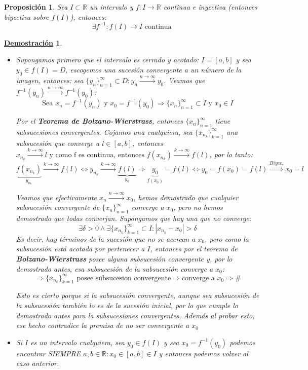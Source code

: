 \documentclass[10pt,a4paper,openright]{book}
\theoremstyle{break}
\newtheorem{prop}{Proposición}[chapter]
\newtheorem*{demo}{\underline{Demostración}}
\begin{document}
\begin{prop}
Sea $I\subset \mathbb R$ un intervalo y $f: I\longrightarrow \mathbb R$ continua e inyectiva (entonces biyectiva sobre $f(I)$), entonces:
$$\exists f^{-1}: f(I)\longrightarrow I\mbox{ continua}$$
\end{prop}
\begin{demo}
\begin{itemize}
\item Supongamos primero que el intervalo es cerrado y acotado: $I=[a,b]$ y sea $y_0\in f(I)=D$, escogemos una sucesión convergente a un número de la imagen, entonces: sea $\{y_n\}_{n=1}^\infty \subset D: y_n\xrightarrow{n\rightarrow \infty} y_0$. Veamos que $f^{-1}(y_n)\xrightarrow{n\rightarrow\infty} f^{-1}(y_0)$:
$$\mbox{Sea }x_n=f^{-1}(y_n)\mbox{ y }x_0=f^{-1}(y_0)\Rightarrow \{x_n\}_{n=1}^\infty\subset I\mbox{ y }x_0\in I$$

Por el \textbf{Teorema de Bolzano-Wierstrass}, entonces $\{x_n\}_{n=1}^\infty$ tiene subsucesiones convergentes. Cojamos una cualquiera, sea $\{x_{n_k}\}_{k=1}^\infty$ una subsucesión que converge a $l\in [a,b]$, entonces $x_{n_k}\xrightarrow{k\rightarrow \infty }l\mbox{ y como f es continua, entonces } f(x_{n_k})\xrightarrow{k\rightarrow \infty}f(l)$, por lo tanto:
$$\underbrace{f(x_{n_k})}_{y_{n_k}}\xrightarrow{k\rightarrow \infty}f(l)\Leftrightarrow y_{n_k}\xrightarrow{k\rightarrow \infty}\underbrace{f(l)}_{y_0}\Rightarrow \underbrace{y_0}_{f(x_0)}=f(l)\Leftrightarrow y_0=f(x_0)=f(l)\stackrel{Biyec.}{\Rightarrow}x_0=l$$

Veamos que efectivamente $x_n\xrightarrow{n\rightarrow\infty}x_0$, hemos demostrado que cualquier subsucesión convergente de $\{x_n\}_{n=1}^\infty$ converge a $x_0$, pero no hemos demostrado que todas converjan. Supongamos que hay una que no converge:
$$\exists \delta>0 \wedge \exists \{x_{n_k}\}_{k=1}^\infty\subset I: |x_{n_k}-x_0|>\delta$$
Es decir, hay términos de la sucesión que no se acercan a $x_0$, pero como la subsucesión está acotada por pertenecer a $I$, entonces por el teorema de \textbf{Bolzano-Wierstrass} posee alguna subsucesión convergente y, por lo demostrado antes, esa subsucesión de la subsucesión converge a $x_0$:
$$\Rightarrow \{x_{n_k}\}_{k=1}^\infty\mbox{ posee subsucesion convergente}\Rightarrow \mbox{converge a }x_0\Rightarrow \#$$

Esto es cierto porque si la subsucesión convergente, aunque sea subsucesión de la subsucesión también lo es de la sucesión inicial, por lo que cumple lo demostrado antes para la subsucesiones convergentes. Además al probar esto, ese hecho contradice la premisa de no ser convergente a $x_0$

\item Si $I$ es un intervalo cualquiera, sea $y_0\in f(I)$ y sea $x_0=f^{-1}(y_0)$ podemos encontrar SIEMPRE $a,b\in \mathbb R: x_0\in [a,b]\in I$ y entonces podemos volver al caso anterior.
\end{itemize}
\end{demo}
\end{document}
